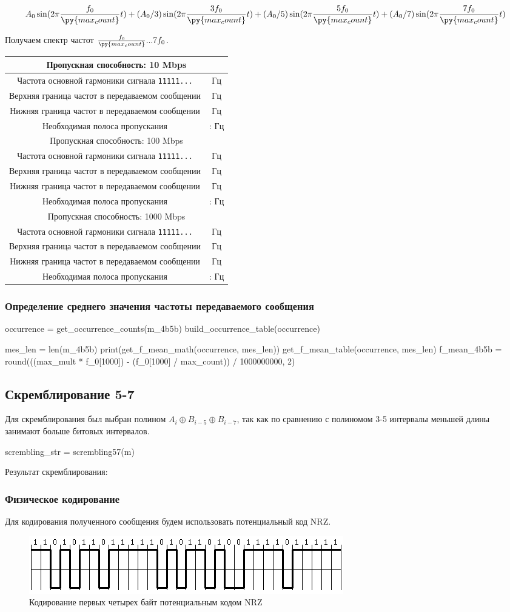 \documentclass[12pt, a4paper]{article}
\newcommand{\bandwidthEntry}[2]{
  \hline
  \multicolumn{2}{|c|}{Пропускная способность: #1 Mbps} \\
  \hline
  Частота основной гармоники сигнала \texttt{11111...} & \py{int(f_0[#1] * #2)} Гц \\
  Верхняя граница частот в передаваемом сообщении & \py{int(max_mult * f_0[#1])} Гц \\
  Нижняя граница частот в передаваемом сообщении & \py{int(f_0[#1] / max_count)} Гц \\
  Необходимая полоса пропускания & \py{int(f_0[#1] / max_count)} : \py{int(max_mult * f_0[#1])} Гц \\
}
\begin{document}
$$A_0 \sin(2 \pi \frac{f_0}{\py{max_count}} t) + (A_0 / 3) \sin(2 \pi \frac{3 f_0}{\py{max_count}} t) +
  (A_0 / 5) \sin(2 \pi \frac{5 f_0}{\py{max_count}} t) + (A_0 / 7) \sin(2 \pi \frac{7 f_0}{\py{max_count}} t)$$

Получаем спектр частот $\frac{f_0}{\py{max_count}}...7 f_0$.

\begin{tabular}{| c | c |}
  \bandwidthEntry{10}{0}
  \bandwidthEntry{100}{0}
  \bandwidthEntry{1000}{0}
  \hline
\end{tabular}

\subsubsection*{Определение среднего значения чаcтоты передаваемого сообщения}

\begin{pycode}
occurrence = get_occurrence_counts(m_4b5b)
build_occurrence_table(occurrence)

mes_len = len(m_4b5b)
print(get_f_mean_math(occurrence, mes_len))
get_f_mean_table(occurrence, mes_len)
f_mean_4b5b = round(((max_mult * f_0[1000]) - (f_0[1000] / max_count)) / 1000000000, 2)
\end{pycode}

\subsection{Скремблирование 5-7}

Для скремблирования был выбран полином $A_i \oplus B_{i-5} \oplus B_{i-7}$,
так как по сравнению с полиномом 3-5 интервалы меньшей длины занимают больше
битовых интервалов.

\begin{pycode}
scrembling_str = scrembling57(m)
\end{pycode}

Результат скремблирования:\\

\subsubsection*{Физическое кодирование}

Для кодирования полученного сообщения будем использовать потенциальный код NRZ.

\begin{figure}[h]
  \begin{center}
    \includegraphics{nrz_scr}
    \caption{Кодирование первых четырех байт потенциальным кодом NRZ}
  \end{center}
\end{figure}
\end{document}
